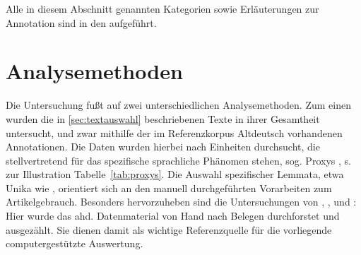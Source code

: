 Alle in diesem Abschnitt genannten Kategorien sowie Erläuterungen zur Annotation  sind in den  \parencite{HZKYL4_2020} aufgeführt.  



\section{Analysemethoden} \label{sec:analysemethoden}

Die Untersuchung fußt auf zwei unterschiedlichen Analysemethoden. Zum einen wurden die in \ref{sec:textauswahl} beschriebenen Texte in ihrer Gesamtheit untersucht, und zwar mithilfe der im Referenzkorpus Altdeutsch  vorhandenen  Annotationen. Die Daten wurden hierbei nach Einheiten durchsucht, die stellvertretend für das spezifische sprachliche Phänomen stehen, sog. Proxys \parencite[vgl.][114]{Lemnitzer2015}, s. zur Illustration Tabelle~\ref{tab:proxys}. Die Auswahl spezifischer Lemmata, etwa Unika wie  , orientiert sich an den manuell durchgeführten Vorarbeiten zum Artikelgebrauch. Besonders hervorzuheben sind die Untersuchungen von \textcite{Graf1905}, \textcite{Bell1907}, \textcite{Hodler1954} und \textcite{Oubouzar1989}: Hier wurde das ahd. Datenmaterial von Hand nach Belegen durchforstet und ausgezählt. Sie dienen damit als wichtige Referenzquelle für die vorliegende computergestützte Auswertung. 

